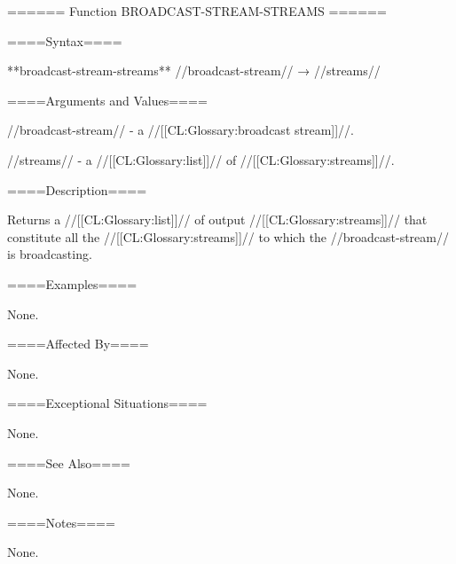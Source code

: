 ====== Function BROADCAST-STREAM-STREAMS ======

====Syntax====

**broadcast-stream-streams** //broadcast-stream// → //streams//

====Arguments and Values====

//broadcast-stream// - a //[[CL:Glossary:broadcast stream]]//.

//streams// - a //[[CL:Glossary:list]]// of //[[CL:Glossary:streams]]//.

====Description====

Returns a //[[CL:Glossary:list]]// of output //[[CL:Glossary:streams]]// that constitute all the //[[CL:Glossary:streams]]// to which the //broadcast-stream// is broadcasting.

====Examples====

None.

====Affected By====

None.

====Exceptional Situations====

None.

====See Also====

None.

====Notes====

None.

